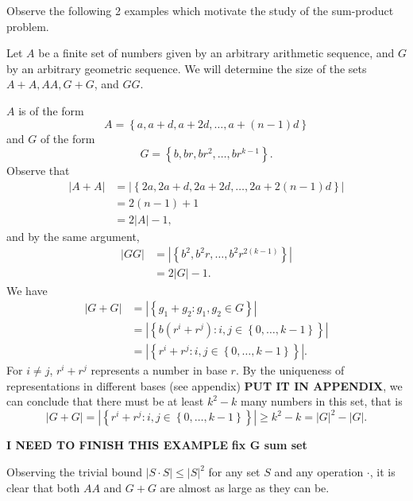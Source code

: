 \documentclass[12pt]{amsart}
\begin{document}
Observe the following 2 examples which motivate the study of the sum-product problem.

Let \(A\) be a finite set of numbers given by an arbitrary arithmetic sequence, and \(G\)
by an arbitrary geometric sequence. We will determine the size of the sets \(A + A, AA , G + G\), and \(GG\). 

\(A\) is of the form
\[
    A = \left\{ a , a + d , a+2d , \dots , a + (n-1)d \right\} 
\]
and \(G\) of the form
\[
    G = \left\{ b, br , br^{2}, \dots , br^{k - 1} \right\} 
.\]
Observe that
\begin{align*}
    \left\lvert A + A \right\rvert  & = \left\lvert \left\{ 2a, 2a + d, 2a + 2d ,\dots , 2a + 2(n-1)d \right\}  \right\rvert \\
    & = 2(n-1) + 1 \\
    & = 2 \left\lvert A \right\rvert - 1,
\end{align*}
and by the same argument,
\begin{align*}
    \left\lvert GG \right\rvert  & = \left\lvert \left\{ b^{2} , b^{2}r , \dots , b^{2}r^{2(k-1)} \right\} \right\rvert  \\
    & =2 \left\lvert G \right\rvert -1.
\end{align*}
We have
\begin{align*}
    \left\lvert G + G \right\rvert & = \left\lvert \left\{ g_1 + g_2 : g_1,g_2 \in G \right\} \right\rvert  \\
    & = \left\lvert \left\{ b(r^{i} + r^{j}): i,j \in \left\{ 0, \dots , k-1 \right\}  \right\} \right\rvert \\
    & = \left\lvert \left\{r^{i} + r^{j}: i,j \in \left\{ 0, \dots , k-1 \right\}  \right\} \right\rvert.
\end{align*}
For \(i \neq j\), \(r^{i} + r^{j}\) represents a number in base \(r\). By the uniqueness of representations
in different bases (see appendix) \textbf{PUT IT IN APPENDIX}, we can conclude that there must be at least \(k^{2}- k\) many numbers in this set, that is
\[
    \left\lvert G + G \right\rvert = \left\lvert \left\{ r^{i} + r^{j} : i,j \in \left\{ 0 , \dots , k-1 \right\}   \right\}  \right\rvert \geq k^{2}- k = \left\lvert G \right\rvert ^{2} - \left\lvert G \right\rvert 
.\]

\textbf{I NEED TO FINISH THIS EXAMPLE}
\textbf{fix G sum set}

Observing the trivial bound \(\left\lvert S \cdot S \right\rvert \leq \left\lvert S \right\rvert ^{2}\) for any set \(S\) and any
operation \(\cdot \), it is clear that both \(AA\) and \(G +G\) are almost as large as they can be.
\end{document}
